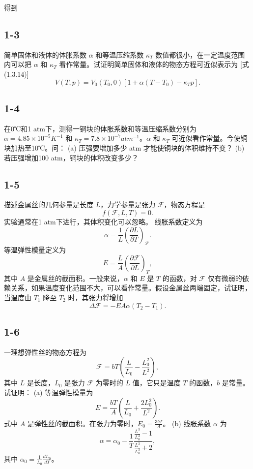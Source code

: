 得到




\newpage
\subsection{1-3}
简单固体和液体的体胀系数 $\alpha$ 和等温压缩系数 $\kappa_T$ 数值都很小，在一定温度范围内可以把 $\alpha$ 和 $\kappa_T$ 看作常量。试证明简单固体和液体的物态方程可近似表示为 [式 (1.3.14)]
$$V(T, p) = V_0 (T_0, 0) \left[ 1 + \alpha (T - T_0) - \kappa_T p \right].$$

\newpage
\subsection{1-4}
在0℃和1 atm下，测得一铜块的体胀系数和等温压缩系数分别为 $\alpha = 4.85 \times 10^{-5} K^{-1}$ 和 $\kappa_T = 7.8 \times 10^{-7} atm^{-1}$。$\alpha$ 和 $\kappa_T$ 可近似看作常量。今使铜块加热至10℃。问：
(a) 压强要增加多少 atm 才能使铜块的体积维持不变？
(b) 若压强增加100 atm，铜块的体积改变多少？

\newpage
\subsection{1-5}
描述金属丝的几何参量是长度 $L$，力学参量是张力 $\mathcal{F}$，物态方程是
$$f(\mathcal{F}, L, T) = 0.$$
实验通常在1 atm下进行，其体积变化可以忽略。
线胀系数定义为
$$\alpha = \frac{1}{L} \left( \frac{\partial L}{\partial T} \right)_{\mathcal{F}}.$$
等温弹性模量定义为
$$E = \frac{L}{A} \left( \frac{\partial \mathcal{F}}{\partial L} \right)_T,$$
其中 $A$ 是金属丝的截面积。一般来说，$\alpha$ 和 $E$ 是 $T$ 的函数，对 $\mathcal{F}$ 仅有微弱的依赖关系，如果温度变化范围不大，可以看作常量。假设金属丝两端固定，试证明，当温度由 $T_1$ 降至 $T_2$ 时，其张力将增加
$$\Delta \mathcal{F} = - E A \alpha (T_2 - T_1).$$

\newpage
\subsection{1-6}
一理想弹性丝的物态方程为
$$\mathcal{F} = bT \left( \frac{L}{L_0} - \frac{L_0^2}{L^2} \right),$$
其中 $L$ 是长度，$L_0$ 是张力 $\mathcal{F}$ 为零时的 $L$ 值，它只是温度 $T$ 的函数，$b$ 是常量。试证明：
(a) 等温弹性模量为
$$E = \frac{bT}{A} \left( \frac{L}{L_0} + \frac{2L_0^2}{L^2} \right).$$
式中 $A$ 是弹性丝的截面积。在张力为零时，$E_0 = \frac{3bT}{A}$。
(b) 线胀系数 $\alpha$ 为
$$\alpha = \alpha_0 - \frac{1}{T} \frac{\frac{L^3}{L_0^3} - 1}{\frac{L^3}{L_0^3} + 2},$$
其中 $\alpha_0 = \frac{1}{L_0} \frac{dL_0}{dT}$。

